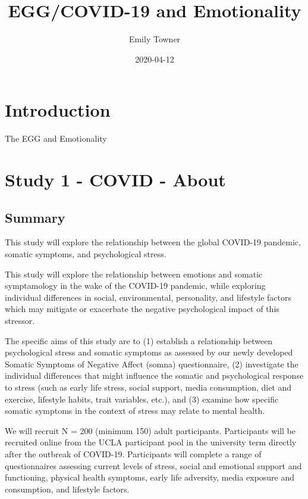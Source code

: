 \documentclass[]{book}
\title{EGG/COVID-19 and Emotionality}
\author{Emily Towner}
\date{2020-04-12}
\begin{document}
\maketitle

{
\setcounter{tocdepth}{1}
\tableofcontents
}
\hypertarget{introduction}{%
\chapter{Introduction}\label{introduction}}

The EGG and Emotionality

\hypertarget{study-1---covid---about}{%
\chapter{Study 1 - COVID - About}\label{study-1---covid---about}}

\hypertarget{summary}{%
\section{Summary}\label{summary}}

This study will explore the relationship between the global COVID-19 pandemic, somatic symptoms, and psychological stress.

This study will explore the relationship between emotions and somatic symptamology in the wake of the COVID-19 pandemic, while exploring individual differences in social, environmental, personality, and lifestyle factors which may mitigate or exacerbate the negative psychological impact of this stressor.

The specific aims of this study are to (1) establish a relationship between psychological stress and somatic symptoms as assessed by our newly developed Somatic Symptoms of Negative Affect (somna) questionnaire, (2) investigate the individual differences that might influence the somatic and psychological response to stress (such as early life stress, social support, media consumption, diet and exercise, lifestyle habits, trait variables, etc.), and (3) examine how specific somatic symptoms in the context of stress may relate to mental health.

We will recruit N = 200 (minimum 150) adult participants. Participants will be recruited online from the UCLA participant pool in the university term directly after the outbreak of COVID-19. Participants will complete a range of questionnaires assessing current levels of stress, social and emotional support and functioning, physical health symptoms, early life adversity, media exposure and consumption, and lifestyle factors.
\end{document}
